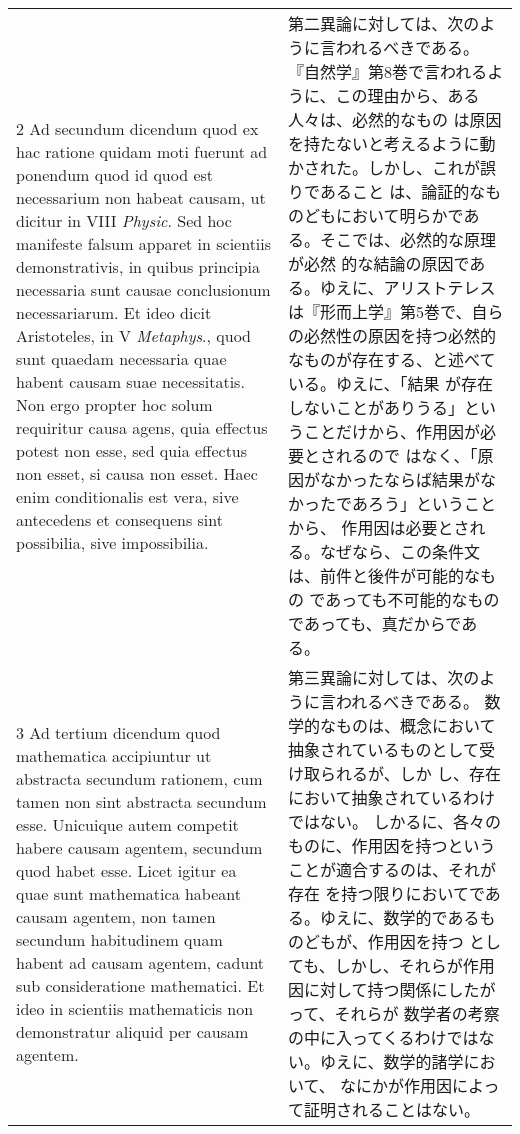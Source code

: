 \documentclass[10pt]{jsarticle} %
\begin{document}
\begin{longtable}{p{21em}p{21em}}
\\

2 {\sc Ad secundum dicendum} quod ex hac ratione quidam moti fuerunt ad
 ponendum quod id quod est necessarium non habeat causam, ut dicitur in
 VIII {\it Physic}. Sed hoc manifeste falsum apparet in scientiis
 demonstrativis, in quibus principia necessaria sunt causae conclusionum
 necessariarum. Et ideo dicit Aristoteles, in V {\it Metaphys}., quod sunt
 quaedam necessaria quae habent causam suae necessitatis. Non ergo
 propter hoc solum requiritur causa agens, quia effectus potest non
 esse, sed quia effectus non esset, si causa non esset. Haec enim
 conditionalis est vera, sive antecedens et consequens sint possibilia,
 sive impossibilia.

&

第二異論に対しては、次のように言われるべきである。
『自然学』第8巻で言われるように、この理由から、ある人々は、必然的なもの
 は原因を持たないと考えるように動かされた。しかし、これが誤りであること
 は、論証的なものどもにおいて明らかである。そこでは、必然的な原理が必然
 的な結論の原因である。ゆえに、アリストテレスは『形而上学』第5巻で、自ら
 の必然性の原因を持つ必然的なものが存在する、と述べている。ゆえに、「結果
 が存在しないことがありうる」ということだけから、作用因が必要とされるので
 はなく、「原因がなかったならば結果がなかったであろう」ということから、
 作用因は必要とされる。なぜなら、この条件文は、前件と後件が可能的なもの
 であっても不可能的なものであっても、真だからである。



\\

3 {\sc Ad tertium dicendum} quod mathematica accipiuntur ut abstracta
 secundum rationem, cum tamen non sint abstracta secundum
 esse. Unicuique autem competit habere causam agentem, secundum quod
 habet esse. Licet igitur ea quae sunt mathematica habeant causam
 agentem, non tamen secundum habitudinem quam habent ad causam agentem,
 cadunt sub consideratione mathematici. Et ideo in scientiis
 mathematicis non demonstratur aliquid per causam agentem.


&

第三異論に対しては、次のように言われるべきである。
数学的なものは、概念において抽象されているものとして受け取られるが、しか
 し、存在において抽象されているわけではない。
しかるに、各々のものに、作用因を持つということが適合するのは、それが存在
 を持つ限りにおいてである。ゆえに、数学的であるものどもが、作用因を持つ
 としても、しかし、それらが作用因に対して持つ関係にしたがって、それらが
 数学者の考察の中に入ってくるわけではない。ゆえに、数学的諸学において、
 なにかが作用因によって証明されることはない。

\end{longtable}
\end{document}
